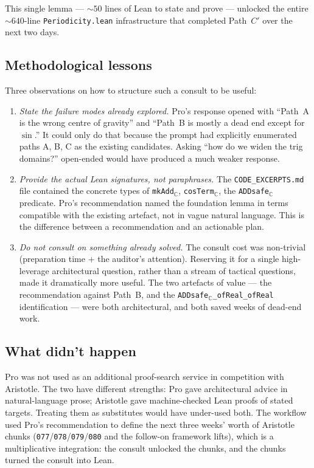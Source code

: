 \documentclass[11pt,a4paper]{article}
\theoremstyle{plain}
\theoremstyle{definition}
\begin{document}
This single lemma --- $\sim$$50$ lines of Lean to state and prove ---
unlocked the entire $\sim$$640$-line \texttt{Periodicity.lean}
infrastructure that completed Path~$C'$ over the next two days.

\subsection*{Methodological lessons}

Three observations on how to structure such a consult to be useful:

\begin{enumerate}[topsep=2pt, itemsep=4pt]
\item \emph{State the failure modes already explored.} Pro's
  response opened with ``Path~A is the wrong centre of gravity'' and
  ``Path~B is mostly a dead end except for $\sin$.'' It could only
  do that because the prompt had explicitly enumerated paths A, B, C
  as the existing candidates. Asking ``how do we widen the trig
  domains?'' open-ended would have produced a much weaker response.

\item \emph{Provide the actual Lean signatures, not paraphrases.}
  The \texttt{CODE\_EXCERPTS.md} file contained the concrete types
  of \texttt{mkAdd}$_{\mathbb{C}}$, \texttt{cosTerm}$_{\mathbb{C}}$,
  the \texttt{ADDsafe}$_{\mathbb{C}}$ predicate. Pro's recommendation
  named the foundation lemma in terms compatible with the existing
  artefact, not in vague natural language. This is the difference
  between a recommendation and an actionable plan.

\item \emph{Do not consult on something already solved.} The
  consult cost was non-trivial (preparation time + the auditor's
  attention). Reserving it for a single high-leverage architectural
  question, rather than a stream of tactical questions, made it
  dramatically more useful. The two artefacts of value --- the
  recommendation against Path~B, and the
  \texttt{ADDsafe}$_{\mathbb{C}}$\texttt{\_ofReal\_ofReal}
  identification --- were both architectural, and both saved
  weeks of dead-end work.
\end{enumerate}

\subsection*{What didn't happen}

Pro was not used as an additional proof-search service in
competition with Aristotle. The two have different strengths: Pro
gave architectural advice in natural-language prose; Aristotle gave
machine-checked Lean proofs of stated targets. Treating them as
substitutes would have under-used both. The workflow used Pro's
recommendation to define the next three weeks' worth of Aristotle
chunks (\texttt{077}/\texttt{078}/\texttt{079}/\texttt{080} and the
follow-on framework lifts), which is a multiplicative integration:
the consult unlocked the chunks, and the chunks turned the consult
into Lean.
\end{document}
